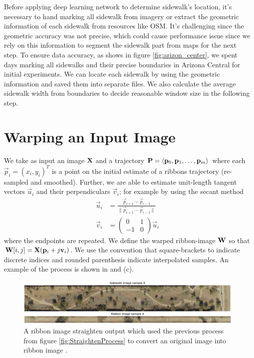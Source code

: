 Before applying deep learning network to determine sidewalk's location, it's necessary to hand marking all sidewalk from imagery or extract the geometric information of each sidewalk from resources like \ac{OSM}. 
It's challenging since the geometric accuracy was not precise, which could cause performance issue since we rely on this information to segment the sidewalk part from maps for the next step. 
To ensure data accuracy, as shows in figure \ref{fig:arizon_center}, we spent days marking all sidewalks and their precise boundaries in Arizona Central for initial experiments. 
We can locate each sidewalk by using the geometric information and saved them into separate files. 
We also calculate the average sidewalk width from boundaries to decide reasonable window size in the following step.

\section{Warping an Input Image}

We take as input an image $\mathbf{X}{}$ and a trajectory $\mathbf{P}{}=\langle \mathbf{p}_0, \mathbf{p}_1,\dots,\mathbf{p}_m\rangle$ where each $\vec{p}_i=(x_i, y_i)^T$ is a point on the initial estimate of a ribbons trajectory (re-sampled and smoothed). 
Further, we are able to estimate unit-length tangent vectors $\vec{u}_i$ and their perpendiculars $\vec{v}_i$; for example by using the secant method 
\begin{align}
  \vec{u}_i &= \frac{\vec{p}_{i+1}-\vec{p}_{i-1}}{\|\vec{p}_{i+1}-\vec{p}_{i-1}\|} \\
  \vec{v}_i &= \left(\begin{array}{cc}
       0  & 1 \\
       -1 & 0
  \end{array} \right) \vec{u}_i
\end{align}
where the endpoints are repeated. 
We define the warped ribbon-image $\mathbf{W}{}$ so that $\mathbf{W}{[i,j]}=\mathbf{X}{}(\mathbf{p}_i+ j \mathbf{v}_i)$. 
We use the convention that square-brackets to indicate discrete indices and rounded parenthesis indicate interpolated samples. 
An example of the process is shown in  and (c). 

\begin{figure}[H]
    \centering
    \includegraphics[width=\textwidth]{Figures/Sample4_needed.png}
    \caption[Sample Sidewalk 1]{A ribbon image straighten output which used the previous process from figure \ref{fig:StraightenProcess} to convert an original image into ribbon image .}
    \label{fig:Sample_Sidewalk_4}
\end{figure}

